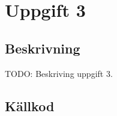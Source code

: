 \section{Uppgift 3}\label{uppgift-3}

\subsection{Beskrivning}
TODO: Beskriving uppgift 3.

\subsection{Källkod}\label{uppgift-3_src}
\inputminted[]{java}{../src/Lab1Uppg03.java}
